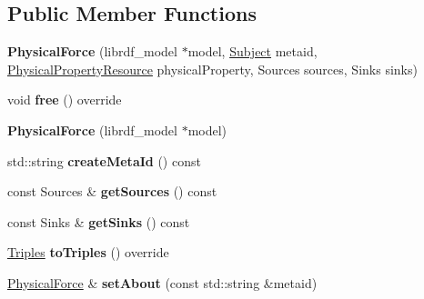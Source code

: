 \subsection*{Public Member Functions}
\begin{DoxyCompactItemize}
\item 
\mbox{\label{classsemsim_1_1PhysicalForce_ab4a55fec692b38b868ddd357f82969bd}} 
{\bfseries Physical\+Force} (librdf\+\_\+model $\ast$model, \hyperlink{classsemsim_1_1Subject}{Subject} metaid, \hyperlink{classsemsim_1_1PhysicalPropertyResource}{Physical\+Property\+Resource} physical\+Property, Sources sources, Sinks sinks)
\item 
\mbox{\label{classsemsim_1_1PhysicalForce_a5d5a07e0f6d88cd5569c78a6039f3de1}} 
void {\bfseries free} () override
\item 
\mbox{\label{classsemsim_1_1PhysicalForce_a08cf520fbe7955eca7766b9d2c5bc0c8}} 
{\bfseries Physical\+Force} (librdf\+\_\+model $\ast$model)
\item 
\mbox{\label{classsemsim_1_1PhysicalForce_a740ffadd18b39ce922b41633db3e24af}} 
std\+::string {\bfseries create\+Meta\+Id} () const
\item 
\mbox{\label{classsemsim_1_1PhysicalForce_a3641e487b723088a5ecf82488877cc34}} 
const Sources \& {\bfseries get\+Sources} () const
\item 
\mbox{\label{classsemsim_1_1PhysicalForce_a5ca80b2444abf551937c7864abea4980}} 
const Sinks \& {\bfseries get\+Sinks} () const
\item 
\mbox{\label{classsemsim_1_1PhysicalForce_a9b8be504b403b781a34ca5df9c3bbc2d}} 
\hyperlink{classsemsim_1_1Triples}{Triples} {\bfseries to\+Triples} () override
\item 
\mbox{\label{classsemsim_1_1PhysicalForce_ad817f08d345b53a2e7fb80052457f8c8}} 
\hyperlink{classsemsim_1_1PhysicalForce}{Physical\+Force} \& {\bfseries set\+About} (const std\+::string \&metaid)
\item 

\end{DoxyCompactItemize}
